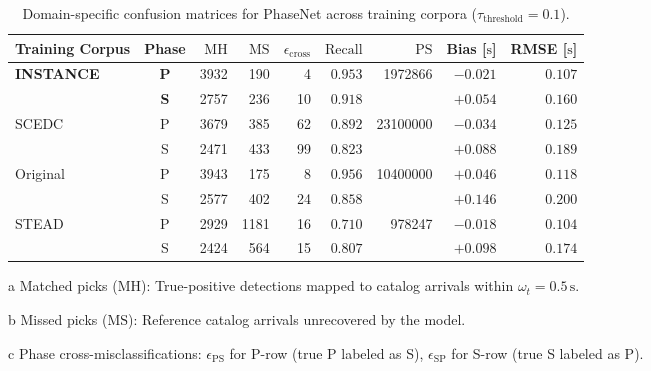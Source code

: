 \begin{table}[htbp]
  \centering
  \small
  \caption{Domain-specific confusion matrices for PhaseNet across training corpora ($\tau_{\mathrm{threshold}} = 0.1$).}
  \label{tab:phasenet_confmtx_datasets}
  \begin{threeparttable}
    \begin{tabularx}{\linewidth}{l c r r r r r r r}
      \toprule
      \textbf{Training Corpus} & \textbf{Phase} & $\mathrm{MH}$\tnote{a} & $\mathrm{MS}$\tnote{b} & $\epsilon_{\mathrm{cross}}$\tnote{c} & $\mathrm{Recall}$\tnote{d} & $\mathrm{PS}$\tnote{e} & \textbf{Bias [$\unit{\second}$]} & \textbf{RMSE [$\unit{\second}$]} \\
      \midrule
      \multirow{2}{*}{\textbf{INSTANCE}} & \textbf{P} & \num{3932} & \num{190} & \num{4} & $\mathbf{0.953}$ & \multirow{2}{*}{\num{1972866}} & $-0.021$ & $0.107$ \\
      & \textbf{S} & \num{2757} & \num{236} & \num{10} & $\mathbf{0.918}$ & & $+0.054$ & $0.160$ \\
      \midrule
      \multirow{2}{*}{SCEDC} & P & \num{3679} & \num{385} & \num{62} & $0.892$ & \multirow{2}{*}{\num{23100000}} & $-0.034$ & $0.125$ \\
      & S & \num{2471} & \num{433} & \num{99} & $0.823$ & & $+0.088$ & $0.189$ \\
      \midrule
      \multirow{2}{*}{Original} & P & \num{3943} & \num{175} & \num{8} & $0.956$ & \multirow{2}{*}{\num{10400000}} & $+0.046$ & $0.118$ \\
      & S & \num{2577} & \num{402} & \num{24} & $0.858$ & & $+0.146$ & $0.200$ \\
      \midrule
      \multirow{2}{*}{STEAD} & P & \num{2929} & \num{1181} & \num{16} & $0.710$ & \multirow{2}{*}{\num{978247}} & $-0.018$ & $0.104$ \\
      & S & \num{2424} & \num{564} & \num{15} & $0.807$ & & $+0.098$ & $0.174$ \\
      \bottomrule
    \end{tabularx}
    \begin{tablenotes}[flushleft]
      \footnotesize
      \item[a] Matched picks ($\mathrm{MH}$): True-positive detections mapped to catalog arrivals within $\omega_t = 0.5\,\unit{\second}$.
      \item[b] Missed picks ($\mathrm{MS}$): Reference catalog arrivals unrecovered by the model.
      \item[c] Phase cross-misclassifications: $\epsilon_{\mathrm{PS}}$ for P-row (true P labeled as S), $\epsilon_{\mathrm{SP}}$ for S-row (true S labeled as P).

\end{tablenotes}
\end{threeparttable}
\end{table}
